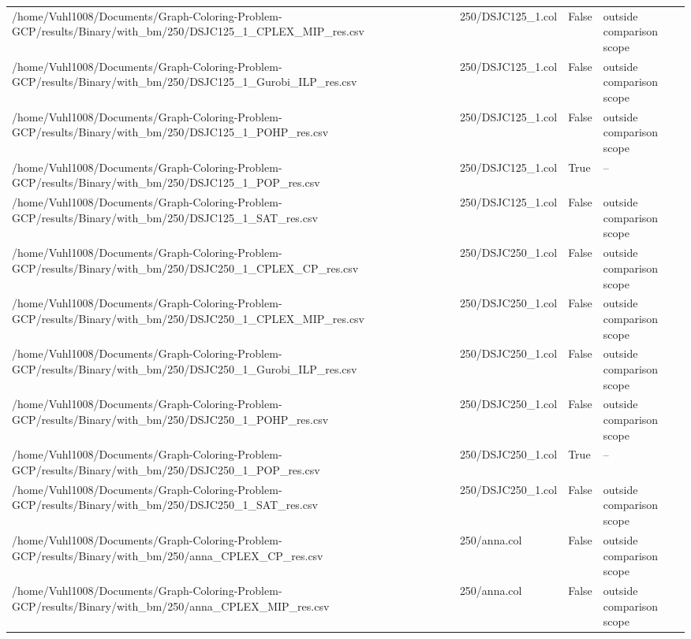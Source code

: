 \begin{table}[htbp]
\begin{tabular}{llll}
/home/Vuhl1008/Documents/Graph-Coloring-Problem-GCP/results/Binary/with\_bm/250/DSJC125\_1\_CPLEX\_MIP\_res.csv & 250/DSJC125\_1.col & False & outside comparison scope \\
/home/Vuhl1008/Documents/Graph-Coloring-Problem-GCP/results/Binary/with\_bm/250/DSJC125\_1\_Gurobi\_ILP\_res.csv & 250/DSJC125\_1.col & False & outside comparison scope \\
/home/Vuhl1008/Documents/Graph-Coloring-Problem-GCP/results/Binary/with\_bm/250/DSJC125\_1\_POHP\_res.csv & 250/DSJC125\_1.col & False & outside comparison scope \\
/home/Vuhl1008/Documents/Graph-Coloring-Problem-GCP/results/Binary/with\_bm/250/DSJC125\_1\_POP\_res.csv & 250/DSJC125\_1.col & True & -- \\
/home/Vuhl1008/Documents/Graph-Coloring-Problem-GCP/results/Binary/with\_bm/250/DSJC125\_1\_SAT\_res.csv & 250/DSJC125\_1.col & False & outside comparison scope \\
/home/Vuhl1008/Documents/Graph-Coloring-Problem-GCP/results/Binary/with\_bm/250/DSJC250\_1\_CPLEX\_CP\_res.csv & 250/DSJC250\_1.col & False & outside comparison scope \\
/home/Vuhl1008/Documents/Graph-Coloring-Problem-GCP/results/Binary/with\_bm/250/DSJC250\_1\_CPLEX\_MIP\_res.csv & 250/DSJC250\_1.col & False & outside comparison scope \\
/home/Vuhl1008/Documents/Graph-Coloring-Problem-GCP/results/Binary/with\_bm/250/DSJC250\_1\_Gurobi\_ILP\_res.csv & 250/DSJC250\_1.col & False & outside comparison scope \\
/home/Vuhl1008/Documents/Graph-Coloring-Problem-GCP/results/Binary/with\_bm/250/DSJC250\_1\_POHP\_res.csv & 250/DSJC250\_1.col & False & outside comparison scope \\
/home/Vuhl1008/Documents/Graph-Coloring-Problem-GCP/results/Binary/with\_bm/250/DSJC250\_1\_POP\_res.csv & 250/DSJC250\_1.col & True & -- \\
/home/Vuhl1008/Documents/Graph-Coloring-Problem-GCP/results/Binary/with\_bm/250/DSJC250\_1\_SAT\_res.csv & 250/DSJC250\_1.col & False & outside comparison scope \\
/home/Vuhl1008/Documents/Graph-Coloring-Problem-GCP/results/Binary/with\_bm/250/anna\_CPLEX\_CP\_res.csv & 250/anna.col & False & outside comparison scope \\
/home/Vuhl1008/Documents/Graph-Coloring-Problem-GCP/results/Binary/with\_bm/250/anna\_CPLEX\_MIP\_res.csv & 250/anna.col & False & outside comparison scope \\

\end{tabular}
\end{table}
